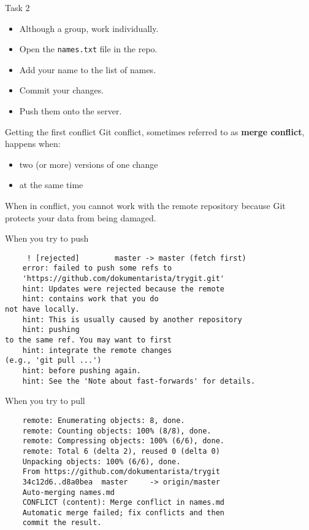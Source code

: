 \documentclass[14pt]{beamer}
\begin{document}
	\begin{frame}{Task 2}
	\begin{itemize}
		\item Although a group, work individually.
		\item Open the \texttt{names.txt} file in the repo.
		\item Add your name to the list of names.
		\item Commit your changes.
		\item Push them onto the server.
	\end{itemize}
	\end{frame}

	\begin{frame}{Getting the first conflict}
	Git conflict, sometimes referred to as \textbf{merge conflict}, happens when:
	
	\vspace{5pt}
	
	\begin{itemize}
		\item two (or more) versions of one change
		\item at the same time
	\end{itemize}

	\vspace{5pt}
	
	When in conflict, you cannot work with the remote repository because Git protects your data from being damaged.

\end{frame}

	\begin{frame}[fragile]{When you try to push}
	\begin{verbatim}
	 ! [rejected]        master -> master (fetch first)
	error: failed to push some refs to 
	'https://github.com/dokumentarista/trygit.git'
	hint: Updates were rejected because the remote 
	hint: contains work that you do
not have locally. 
	hint: This is usually caused by another repository 
	hint: pushing
to the same ref. You may want to first 
	hint: integrate the remote changes
(e.g., 'git pull ...')
	hint: before pushing again.
	hint: See the 'Note about fast-forwards' for details.
	\end{verbatim}
	\end{frame}

	\begin{frame}[fragile]{When you try to pull}
	\begin{verbatim}
	remote: Enumerating objects: 8, done.
	remote: Counting objects: 100% (8/8), done.
	remote: Compressing objects: 100% (6/6), done.
	remote: Total 6 (delta 2), reused 0 (delta 0) 
	Unpacking objects: 100% (6/6), done.
	From https://github.com/dokumentarista/trygit
	34c12d6..d8a0bea  master     -> origin/master
	Auto-merging names.md
	CONFLICT (content): Merge conflict in names.md
	Automatic merge failed; fix conflicts and then 
	commit the result.
	\end{verbatim}
\end{frame}
\end{document}
